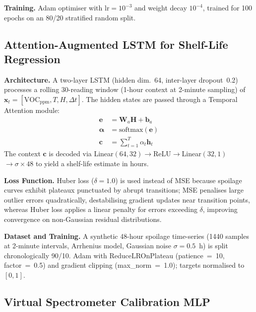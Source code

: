 \documentclass[conference]{IEEEtran}
\begin{document}
\textbf{Training.} Adam optimiser with $\text{lr}=10^{-3}$ and
weight decay $10^{-4}$, trained for 100 epochs on an 80/20 stratified
random split.

\subsection{Attention-Augmented LSTM for Shelf-Life Regression}

\textbf{Architecture.} A two-layer LSTM (hidden dim.~64, inter-layer
dropout~0.2) processes a rolling 30-reading window (1-hour context at
2-minute sampling) of $\mathbf{x}_t = [\text{VOC}_\text{ppm}, T, H, \Delta t]$.
The hidden states are passed through a Temporal Attention module:
\begin{align}
  \mathbf{e} &= \mathbf{W}_a \mathbf{H} + \mathbf{b}_a \\
  \boldsymbol{\alpha} &= \text{softmax}(\mathbf{e}) \\
  \mathbf{c} &= \sum_{t=1}^{T} \alpha_t \mathbf{h}_t
\end{align}
The context $\mathbf{c}$ is decoded via
Linear$(64,32)$$\to$ReLU$\to$Linear$(32,1)$$\to\sigma \times 48$
to yield a shelf-life estimate in hours.

\textbf{Loss Function.} Huber loss ($\delta = 1.0$) is used instead of
MSE because spoilage curves exhibit plateaux punctuated by abrupt
transitions; MSE penalises large outlier errors quadratically,
destabilising gradient updates near transition points, whereas Huber
loss applies a linear penalty for errors exceeding $\delta$, improving
convergence on non-Gaussian residual distributions.

\textbf{Dataset and Training.} A synthetic 48-hour spoilage time-series
(1440 samples at 2-minute intervals, Arrhenius model, Gaussian noise
$\sigma{=}0.5$~h) is split chronologically 90/10. Adam with
ReduceLROnPlateau (patience~=~10, factor~=~0.5) and gradient clipping
(max\_norm~=~1.0); targets normalised to $[0, 1]$.

\subsection{Virtual Spectrometer Calibration MLP}
\end{document}
